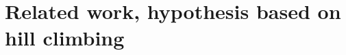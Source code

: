 \documentclass{beamer}
\begin{document}
\section{Related work, hypothesis based on hill climbing}



\end{document}

